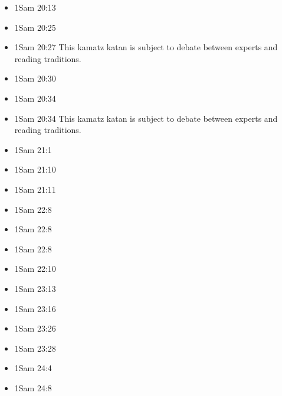 \documentclass[14pt]{article}
\begin{document}
\begin{multicols}{2}
\begin{itemize}
							\item 1Sam 20:13
							
							\item 1Sam 20:25
							
							\item 1Sam 20:27 This kamatz katan is subject to debate between experts and reading traditions.
							
							\item 1Sam 20:30
							
							\item 1Sam 20:34
							
							\item 1Sam 20:34 This kamatz katan is subject to debate between experts and reading traditions.
							
							\item 1Sam 21:1
							
							\item 1Sam 21:10
							
							\item 1Sam 21:11
							
							\item 1Sam 22:8
							
							\item 1Sam 22:8
							
							\item 1Sam 22:8
							
							\item 1Sam 22:10
							
							\item 1Sam 23:13
							
							\item 1Sam 23:16
							
							\item 1Sam 23:26
							
							\item 1Sam 23:28
							
							\item 1Sam 24:4
							
							\item 1Sam 24:8
							

\end{itemize}
\end{multicols}
\end{document}
